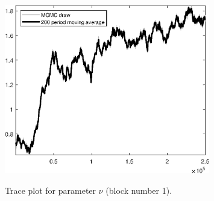 \begin{figure}[H]
\centering
  \includegraphics[width=0.8\textwidth]{BRS_aggregate/graphs/TracePlot_nu_blck_1}\\
    \caption{Trace plot for parameter $\nu$ (block number 1).}
\end{figure}
